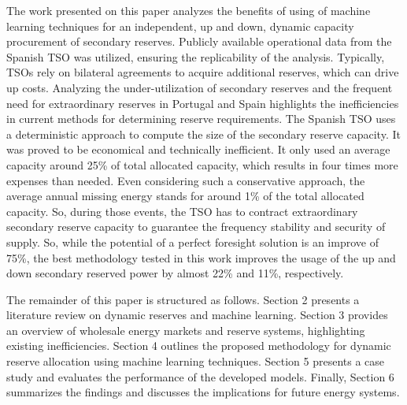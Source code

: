 The work presented on this paper analyzes the benefits of using of machine learning techniques for an independent, up and down, dynamic capacity procurement of secondary reserves. Publicly available operational data from the Spanish \gls{TSO} was utilized, ensuring the replicability of the analysis. Typically, \gls{TSO}s rely on bilateral agreements to acquire additional reserves, which can drive up costs. Analyzing the under-utilization of secondary reserves and the frequent need for extraordinary reserves in Portugal and Spain highlights the inefficiencies in current methods for determining reserve requirements. 
\textcolor[rgb]{0,0.5,0}{The Spanish TSO uses a deterministic approach to compute the size of the secondary reserve capacity. It was proved to be economical and technically inefficient. It only used an average capacity around 25\% of total allocated capacity, which results in four times more expenses than needed. Even considering such a conservative approach, the average annual missing energy stands for around 1\% of the total allocated capacity\cite{Frade:19c,Algarvio2024,Algarvio:24,Martin:18}}. So, during those events, the TSO has to contract extraordinary secondary reserve capacity to guarantee the frequency stability and security of supply. So, while the potential of a perfect foresight solution is an improve of 75\%, the best methodology tested in this work improves the usage of the up and down secondary reserved power by almost 22\% and 11\%, respectively. 
\par

The remainder of this paper is structured as follows. Section 2 presents a literature review on dynamic reserves and machine learning. Section 3 provides an overview of wholesale energy markets and reserve systems, highlighting existing inefficiencies. Section 4 outlines the proposed methodology for dynamic reserve allocation using machine learning techniques. Section 5 presents a case study and evaluates the performance of the developed models. Finally, Section 6 summarizes the findings and discusses the implications for future energy systems.\par

